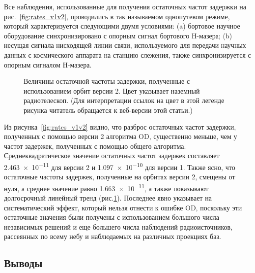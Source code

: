 Все наблюдения, использованные для получения остаточных частот задержки на
рис.~\ref{fig:rates_v1v2}, проводились в так называемом однопутевом режиме, который
характеризуется следующими двумя условиями: (a) бортовое научное оборудование синхронизировано с
опорным сигнал бортового H-мазера; (b) несущая сигнала нисходящей линии связи, используемого для
передачи научных данных с космического аппарата на станцию слежения, также синхронизируется с
опорным сигналом H-мазера.

\begin{figure}[tbh]
 \caption{Величины остаточной частоты задержки, полученные с использованием орбит версии 2. Цвет
указывает наземный радиотелескоп. (Для интерпретации ссылок на цвет в этой легенде
рисунка читатель обращается к веб-версии этой статьи.)}
 \label{fig:rrates}
\end{figure}

Из рисунка~\ref{fig:rates_v1v2} видно, что разброс остаточных частот задержки, полученных с
помощью версии 2 алгоритма OD, существенно меньше, чем у частот задержек, полученных с помощью
общего алгоритма. Среднеквадратическое значение остаточных частот задержек составляет
\num{2.463e-11} для версии 2 и \num{1.097e-10} для версии 1. Также ясно, что остаточные частоты
задержек, полученные на орбитах версии 2, смещены от нуля, а среднее значение равно
\num{1.663e-11}, а также показывают долгосрочный линейный тренд (рис.\ref{fig:rrates}). Последнее
явно указывает на систематический эффект, который нельзя отнести к ошибке OD, поскольку эти
остаточные значения были получены с использованием большого числа независимых решений и
еще большего числа наблюдений радиоисточников, рассеянных по всему небу и наблюдаемых на различных
проекциях баз.

\subsection{Выводы}

